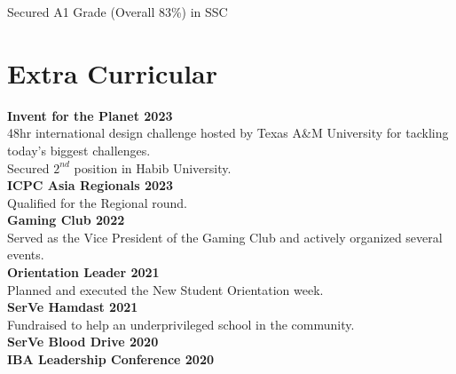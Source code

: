 \documentclass[]{resume}
\begin{document}
\begin{minipage}[t]{0.59\textwidth}
     
    \begin{tightemize}
        \item Secured A1 Grade (Overall 83\%) in SSC
    \end{tightemize}


\section{Extra Curricular}
\textbf{Invent for the Planet 2023}\\
48hr international design challenge hosted by Texas A\&M University for tackling today's biggest challenges. \\
Secured $2^{nd}$ position in Habib University. \\
\textbf{ICPC Asia Regionals 2023}\\
Qualified for the Regional round. \\ 
\textbf{Gaming Club 2022}\\
Served as the Vice President of the Gaming Club and actively organized several events. \\ 
\textbf{Orientation Leader 2021}\\
Planned and executed the New Student Orientation week.\\
\textbf{SerVe Hamdast 2021}\\
Fundraised to help an underprivileged school in the community. \\ 
\textbf{SerVe Blood Drive 2020}\\
\textbf{IBA Leadership Conference 2020}\\



%
%

\end{minipage} 
\hfill
\end{document}
